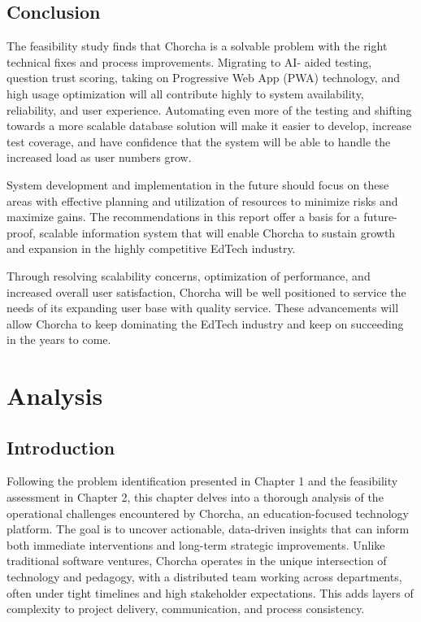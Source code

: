 \documentclass[12pt,a4paper,oneside]{book}
\begin{document}
\section{Conclusion}
The feasibility study finds that Chorcha is a solvable problem
with the right technical fixes and process improvements. Migrating to AI-
aided testing, question trust scoring, taking on Progressive Web App (PWA) technology, and high usage optimization will all contribute highly to system availability, reliability, and user experience. Automating even more of the testing and shifting towards a more scalable database solution will make it easier to develop, increase test coverage, and have confidence that the system will be able to handle the increased load as user numbers grow.\\
\begin{tcolorbox}[benefitbox, title=Future Implementation Strategy]
System development and implementation in the future should focus on these areas with effective planning and utilization of resources to minimize risks and maximize gains. The recommendations in this report offer a basis for a future-proof, scalable information system that will enable Chorcha to sustain growth and expansion in the highly competitive EdTech industry.

Through resolving scalability concerns, optimization of performance, and increased overall user satisfaction, Chorcha will be well positioned to service the needs of its expanding user base with quality service. These advancements will allow Chorcha to keep dominating the EdTech industry and keep on succeeding in the years to come.
\end{tcolorbox}
\newpage


\chapter{Analysis}



\section{Introduction}

Following the problem identification presented in Chapter 1 and the feasibility assessment in Chapter 2, this chapter delves into a thorough analysis of the operational challenges encountered by Chorcha, an education-focused technology platform. The goal is to uncover actionable, data-driven insights that can inform both immediate interventions and long-term strategic improvements. Unlike traditional software ventures, Chorcha operates in the unique intersection of technology and pedagogy, with a distributed team working across departments, often under tight timelines and high stakeholder expectations. This adds layers of complexity to project delivery, communication, and process consistency.
\end{document}
